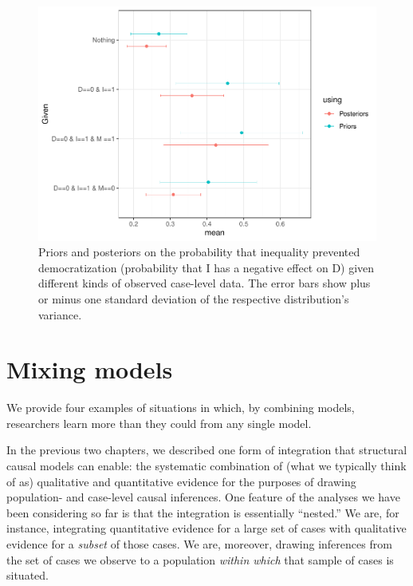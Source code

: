 \documentclass[
  12pt,
]{book}
\newenvironment{headerbox}{
  \definecolor{shadecolor}{rgb}{0.8, 0.8, 0.8}  %
  \color{black}
  \begin{shaded}}{\end{shaded}}
\begin{document}
\begin{figure}
\centering
\includegraphics{ii_files/figure-latex/dprevented-1.pdf}
\caption{\label{fig:dprevented}Priors and posteriors on the probability that inequality prevented democratization (probability that I has a negative effect on D) given different kinds of observed case-level data. The error bars show plus or minus one standard deviation of the respective distribution's variance.}
\end{figure}

\hypertarget{mm}{%
\chapter{Mixing models}\label{mm}}

\begin{headerbox}
We provide four examples of situations in which, by combining models, researchers learn more than they could from any single model.

\end{headerbox}

In the previous two chapters, we described one form of integration that structural causal models can enable: the systematic combination of (what we typically think of as) qualitative and quantitative evidence for the purposes of drawing population- and case-level causal inferences. One feature of the analyses we have been considering so far is that the integration is essentially ``nested.'' We are, for instance, integrating quantitative evidence for a large set of cases with qualitative evidence for a \emph{subset} of those cases. We are, moreover, drawing inferences from the set of cases we observe to a population \emph{within which} that sample of cases is situated.
\end{document}
